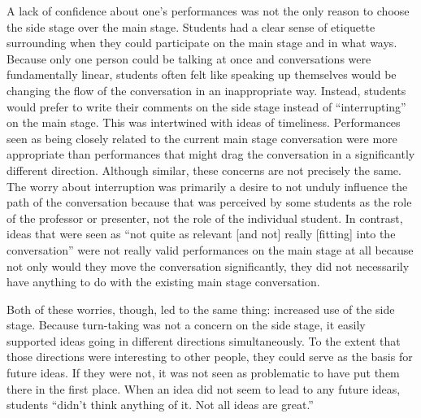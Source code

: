 A lack of confidence about one's performances was not the only reason to choose the side stage over the main stage. Students had a clear sense of etiquette surrounding when they could participate on the main stage and in what ways. Because only one person could be talking at once and conversations were fundamentally linear, students often felt like speaking up themselves would be changing the flow of the conversation in an inappropriate way. Instead, students would prefer to write their comments on the side stage instead of ``interrupting'' on the main stage. This was intertwined with ideas of timeliness. Performances seen as being closely related to the current main stage conversation were more appropriate than performances that might drag the conversation in a significantly different direction. Although similar, these concerns are not precisely the same. The worry about interruption was primarily a desire to not unduly influence the path of the conversation because that was perceived by some students as the role of the professor or presenter, not the role of the individual student. In contrast, ideas that were seen as ``not quite as relevant [and not] really [fitting] into the conversation'' were not really valid performances on the main stage at all because not only would they move the conversation significantly, they did not necessarily have anything to do with the existing main stage conversation.

Both of these worries, though, led to the same thing: increased use of the side stage. Because turn-taking was not a concern on the side stage, it easily supported ideas going in different directions simultaneously. To the extent that those directions were interesting to other people, they could serve as the basis for future ideas. If they were not, it was not seen as problematic to have put them there in the first place. When an idea did not seem to lead to any future ideas, students ``didn't think anything of it. Not all ideas are great.''


